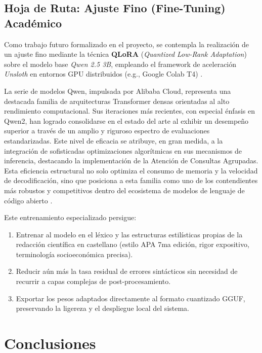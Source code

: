 \documentclass[12pt,a4paper]{article}
\begin{document}
\subsection{Hoja de Ruta: Ajuste Fino (Fine-Tuning) Académico}
Como trabajo futuro formalizado en el proyecto, se contempla la realización de un ajuste fino mediante la técnica \textbf{QLoRA} (\textit{Quantized Low-Rank Adaptation}) \cite{dettmers2024qlora} sobre el modelo base \textit{Qwen 2.5 3B}, empleando el framework de aceleración \textit{Unsloth} en entornos GPU distribuidos (e.g., Google Colab T4) \cite{dettmers2023qlora}.

La serie de modelos Qwen, impulsada por Alibaba Cloud, representa una destacada familia de arquitecturas Transformer densas orientadas al alto rendimiento computacional. Sus iteraciones más recientes, con especial énfasis en Qwen2, han logrado consolidarse en el estado del arte al exhibir un desempeño superior a través de un amplio y riguroso espectro de evaluaciones estandarizadas. Este nivel de eficacia se atribuye, en gran medida, a la integración de sofisticadas optimizaciones algorítmicas en sus mecanismos de inferencia, destacando la implementación de la Atención de Consultas Agrupadas. Esta eficiencia estructural no solo optimiza el consumo de memoria y la velocidad de decodificación, sino que posiciona a esta familia como uno de los contendientes más robustos y competitivos dentro del ecosistema de modelos de lenguaje de código abierto \cite{monteiro2026llm}.

Este entrenamiento especializado persigue:
\begin{enumerate}[noitemsep]
    \item Entrenar al modelo en el léxico y las estructuras estilísticas propias de la redacción científica en castellano (estilo APA 7ma edición, rigor expositivo, terminología socioeconómica precisa).
    \item Reducir aún más la tasa residual de errores sintácticos sin necesidad de recurrir a capas complejas de post-procesamiento.
    \item Exportar los pesos adaptados directamente al formato cuantizado GGUF, preservando la ligereza y el despliegue local del sistema.
\end{enumerate}

\section{Conclusiones}
\label{sec:conclusiones}
\end{document}
